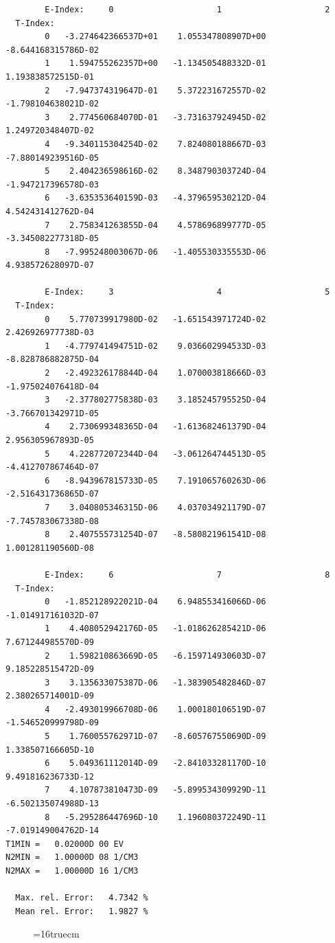 \documentclass[12pt,dvipdfmx]{article}
\begin{document}
\begin{small}\begin{verbatim}
        E-Index:     0                     1                     2
  T-Index:
        0   -3.274642366537D+01    1.055347808907D+00   -8.644168315786D-02
        1    1.594755262357D+00   -1.134505488332D-01    1.193838572515D-01
        2   -7.947374319647D-01    5.372231672557D-02   -1.798104638021D-02
        3    2.774560684070D-01   -3.731637924945D-02    1.249720348407D-02
        4   -9.340115304254D-02    7.824080188667D-03   -7.880149239516D-05
        5    2.404236598616D-02    8.348790303724D-04   -1.947217396578D-03
        6   -3.635353640159D-03   -4.379659530212D-04    4.542431412762D-04
        7    2.758341263855D-04    4.578696899777D-05   -3.345082277318D-05
        8   -7.995248003067D-06   -1.405530335553D-06    4.938572628097D-07

        E-Index:     3                     4                     5
  T-Index:
        0    5.770739917980D-02   -1.651543971724D-02    2.426926977738D-03
        1   -4.779741494751D-02    9.036602994533D-03   -8.828786882875D-04
        2   -2.492326178844D-04    1.070003818666D-03   -1.975024076418D-04
        3   -2.377802775838D-03    3.185245795525D-04   -3.766701342971D-05
        4    2.730699348365D-04   -1.613682461379D-04    2.956305967893D-05
        5    4.228772072344D-04   -3.061264744513D-05   -4.412707867464D-07
        6   -8.943967815733D-05    7.191065760263D-06   -2.516431736865D-07
        7    3.040805346315D-06    4.037034921179D-07   -7.745783067338D-08
        8    2.407555731254D-07   -8.580821961541D-08    1.001281190560D-08

        E-Index:     6                     7                     8
  T-Index:
        0   -1.852128922021D-04    6.948553416066D-06   -1.014917161032D-07
        1    4.408052942176D-05   -1.018626285421D-06    7.671244985570D-09
        2    1.598210863669D-05   -6.159714930603D-07    9.185228515472D-09
        3    3.135633075387D-06   -1.383905482846D-07    2.380265714001D-09
        4   -2.493019966708D-06    1.000180106519D-07   -1.546520999798D-09
        5    1.760055762971D-07   -8.605767550690D-09    1.338507166605D-10
        6    5.049361112014D-09   -2.841033281170D-10    9.491816236733D-12
        7    4.107873810473D-09   -5.899534309929D-11   -6.502135074988D-13
        8   -5.295286447696D-10    1.196080372249D-11   -7.019149004762D-14
T1MIN =   0.02000D 00 EV
N2MIN =   1.00000D 08 1/CM3
N2MAX =   1.00000D 16 1/CM3

  Max. rel. Error:   4.7342 %
  Mean rel. Error:   1.9827 %
\end{verbatim}\end{small}
\begin{figure} \label{7.2.3b}
\epsfxsize=16truecm
\end{figure}
\newpage
\end{document}
